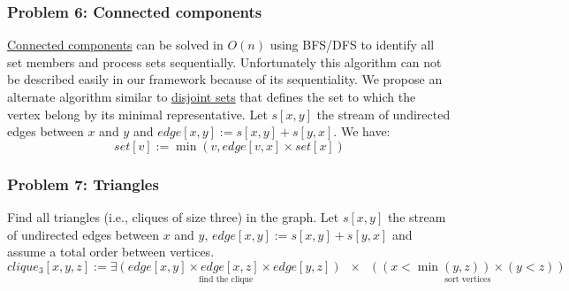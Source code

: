 \documentclass[11pt]{article}
\begin{document}
\subsubsection*{Problem 6: Connected components}
\href{http://en.wikipedia.org/wiki/Connected_component_(graph_theory)}{Connected components} can be solved in $O(n)$ using BFS/DFS to identify all set members and process sets sequentially. Unfortunately this algorithm can not be described easily in our framework because of its sequentiality. We propose an alternate algorithm similar to \href{http://en.wikipedia.org/wiki/Disjoint-set_data_structure}{disjoint sets} that defines the set to which the vertex belong by its minimal representative. Let $s[x,y]$ the stream of undirected edges between $x$ and $y$ and $edge[x,y] := s[x,y]+s[y,x]$. We have:
\[set[v] := \min(v, edge[v,x] \times set[x])\]

\subsubsection*{Problem 7: Triangles}
Find all triangles (i.e., cliques of size three) in the graph. Let $s[x,y]$ the stream of undirected edges between $x$ and $y$, $edge[x,y] := s[x,y]+s[y,x]$ and assume a total order between vertices.
\[clique_3[x,y,z] := \underset{\text{find the clique}}{\exists(edge[x,y] \times edge[x,z] \times edge[y,z])}
	\;\;\times\;\; \underset{\text{sort vertices}}{((x< \min(y,z)) \times (y < z))}\]

\end{document}
